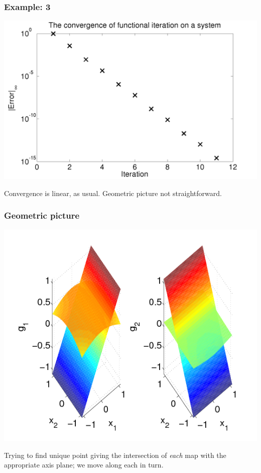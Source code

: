 \documentclass{beamer}
\begin{document}
\begin{frame}
  \frametitle{Example: 3}

  \begin{center}
    \includegraphics[height=0.7\textheight]{figures/NonlinearSystemExample1}
  \end{center}
  Convergence is linear, as usual.  Geometric picture not straightforward.

\end{frame}

\begin{frame}
  \frametitle{Geometric picture}

  \begin{center}
    \includegraphics[height=0.7\textheight]{figures/NonlinearSystemGeom1}
  \end{center}
  Trying to find unique point giving the intersection of
  \emph{each} map with the appropriate axis plane; we move along each
  in turn.

\end{frame}
\end{document}
